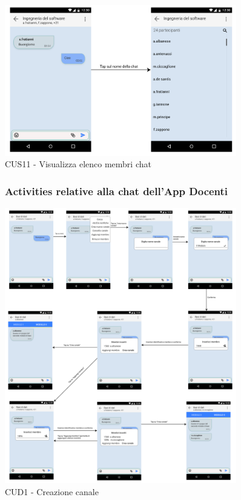 \begin{figure}
	\centering
	\includegraphics[width=0.9\textwidth]{imgs/gruppo6/activities/act_cus11_elenco_membri.pdf}
	\caption{CUS11 - Visualizza elenco membri chat}
	\label{fig:act-cus11}
\end{figure}

\pagebreak
\begin{figure}[!h]
	\subsubsection{Activities relative alla chat dell'App Docenti}
	\centering
	\includegraphics[width=0.9\textwidth]{imgs/gruppo6/activities/act_cud1_creazione_canale.pdf}
	\caption{CUD1 - Creazione canale}
	\label{fig:act-cud1}
\end{figure}

